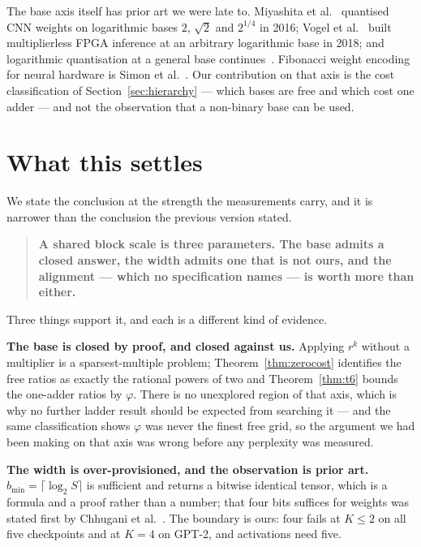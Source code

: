 \documentclass[11pt]{article}
\theoremstyle{definition}
\begin{document}
The base axis itself has prior art we were late to.
Miyashita et al.~\cite{miyashita} quantised CNN weights on logarithmic bases
$2$, $\sqrt2$ and $2^{1/4}$ in 2016; Vogel et al.~\cite{vogel} built
multiplierless FPGA inference at an arbitrary logarithmic base in 2018; and
logarithmic quantisation at a general base continues~\cite{logbquant}. Fibonacci
weight encoding for neural hardware is Simon et al.~\cite{simon}. Our
contribution on that axis is the cost classification of
Section~\ref{sec:hierarchy} --- which bases are free and which cost one adder ---
and not the observation that a non-binary base can be used.



\section{What this settles}
\label{sec:settles}

We state the conclusion at the strength the measurements carry, and it is
narrower than the conclusion the previous version stated.

\begin{quote}
\textbf{A shared block scale is three parameters. The base admits a closed
answer, the width admits one that is not ours, and the alignment --- which no
specification names --- is worth more than either.}
\end{quote}

Three things support it, and each is a different kind of evidence.

\textbf{The base is closed by proof, and closed against us.} Applying $r^{k}$
without a multiplier is a sparsest-multiple problem;
Theorem~\ref{thm:zerocost} identifies the free ratios as exactly the rational
powers of two and Theorem~\ref{thm:t6} bounds the one-adder ratios by $\varphi$.
There is no unexplored region of that axis, which is why no further ladder result
should be expected from searching it --- and the same classification shows
$\varphi$ was never the finest free grid, so the argument we had been making on
that axis was wrong before any perplexity was measured.

\textbf{The width is over-provisioned, and the observation is prior
art.} $b_{\min} = \lceil\log_2 S\rceil$ is sufficient and returns a bitwise
identical tensor, which is a formula and a proof rather than a number; that four
bits suffices for weights was stated first by Chhugani et al.~\cite{chhugani}.
The boundary is ours: four fails at $K\leq2$ on all five checkpoints and at $K=4$
on GPT-2, and activations need five.
\end{document}
